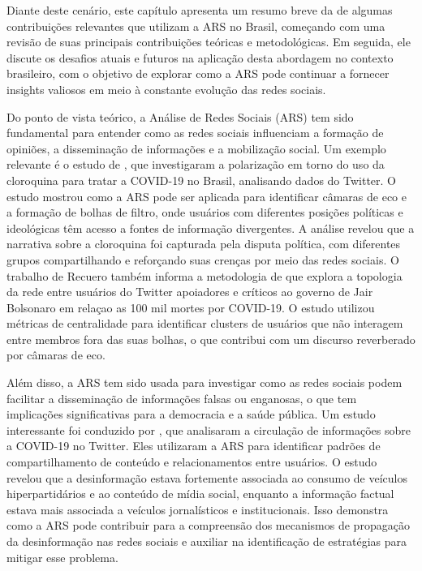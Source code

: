 Diante deste cenário, este capítulo apresenta um resumo breve da de algumas contribuições relevantes que utilizam a ARS no Brasil, começando com uma revisão de suas principais contribuições teóricas e metodológicas. Em seguida, ele discute os desafios atuais e futuros na aplicação desta abordagem no contexto brasileiro, com o objetivo de explorar como a ARS pode continuar a fornecer insights valiosos em meio à constante evolução das redes sociais.

Do ponto de vista teórico, a Análise de Redes Sociais (ARS) tem sido fundamental para entender como as redes sociais influenciam a formação de opiniões, a disseminação de informações e a mobilização social. Um exemplo relevante é o estudo de , que investigaram a polarização em torno do uso da cloroquina para tratar a COVID-19 no Brasil, analisando dados do Twitter. O estudo mostrou como a ARS pode ser aplicada para identificar câmaras de eco e a formação de bolhas de filtro, onde usuários com diferentes posições políticas e ideológicas têm acesso a fontes de informação divergentes. A análise revelou que a narrativa sobre a cloroquina foi capturada pela disputa política, com diferentes grupos compartilhando e reforçando suas crenças por meio das redes sociais. O trabalho de Recuero também informa a metodologia de  que explora a topologia da rede entre usuários do Twitter apoiadores e críticos ao governo de Jair Bolsonaro em relaçao as 100 mil mortes por COVID-19. O estudo utilizou métricas de centralidade para identificar clusters de usuários que não interagem entre membros fora das suas bolhas, o que contribui com um discurso reverberado por câmaras de eco.

Além disso, a ARS tem sido usada para investigar como as redes sociais podem facilitar a disseminação de informações falsas ou enganosas, o que tem implicações significativas para a democracia e a saúde pública. Um estudo interessante foi conduzido por , que analisaram a circulação de informações sobre a COVID-19 no Twitter. Eles utilizaram a ARS para identificar padrões de compartilhamento de conteúdo e relacionamentos entre usuários. O estudo revelou que a desinformação estava fortemente associada ao consumo de veículos hiperpartidários e ao conteúdo de mídia social, enquanto a informação factual estava mais associada a veículos jornalísticos e institucionais. Isso demonstra como a ARS pode contribuir para a compreensão dos mecanismos de propagação da desinformação nas redes sociais e auxiliar na identificação de estratégias para mitigar esse problema.

